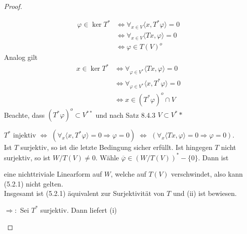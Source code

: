 \documentclass[12pt,a4paper]{article}
\theoremstyle{definition}
\theoremstyle{remark}
\renewcommand{\bar}[1]{\overline{#1}}
\begin{document}
	\begin{proof}
		\begin{proofenum}
			\item 	
				\begin{equation}
					\begin{split}
						\varphi \in \ker T^* & \Leftrightarrow \forall_{x \in V} \langle x, T^* \varphi \rangle = 0 \\
						& \Leftrightarrow \forall_{x \in V} \langle Tx, \varphi \rangle = 0 \\
						& \Leftrightarrow \varphi \in T(V)^o
					\end{split}
				\end{equation}
				Analog gilt
				\begin{equation}
					\begin{split}
						x \in \ker T^* &\Leftrightarrow \forall_{\varphi \in V^*} \langle Tx, \varphi \rangle = 0 \\
						&\Leftrightarrow \forall_{\varphi \in V^*} \langle x, T^* \varphi \rangle = 0 \\
						&\Leftrightarrow x \in (T^* \varphi)^o \cap V
					\end{split}
				\end{equation}
				Beachte, dass $(T^* \varphi)^o \subset V^{**}$ und nach Satz 8.4.3 $V \subset V^**$
			\item 
				$T^*$ injektiv $\Leftrightarrow$ $\left( \forall_x \langle x, T^* \varphi \rangle = 0 \Rightarrow \varphi = 0 \right)$ $\Leftrightarrow$ $\left( \forall_x \langle Tx, \varphi \rangle = 0 \Rightarrow \varphi = 0 \right)$. \\
				Ist $T$ surjektiv, so ist die letzte Bedingung sicher erfüllt. Ist hingegen $T$ nicht surjektiv, so ist $W/T(V) \neq 0$. Wähle $\bar{\varphi} \in (W/T(V))^* -  \{ 0 \}$. Dann ist
				\begin{center}
				\end{center}
				eine nichttriviale Linearform auf $W$, welche auf $T(V)$ verschwindet, also kann (5.2.1) nicht gelten. \\
				Insgesamt ist (5.2.1) äquivalent zur Surjektivität von $T$ und (ii) ist bewiesen. \\
			\item
				$\Rightarrow:$ Sei $T^*$ surjektiv. Dann liefert (i)

\end{proofenum}
\end{proof}
\end{document}
